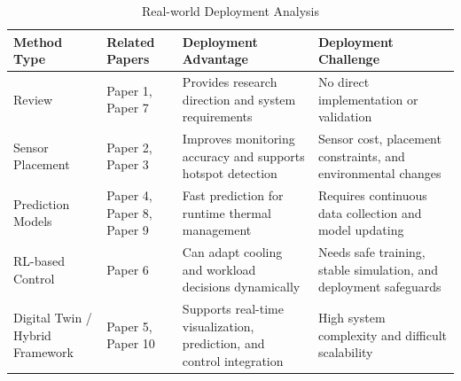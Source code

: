 \documentclass[12pt,a4paper]{article}
\begin{document}
                    \begin{table}[h]
                    \centering
                    \caption{Real-world Deployment Analysis}
                    \label{tab:deployment_analysis}
                    \begin{tabular}{p{3cm} p{4cm} p{4cm} p{4cm}}
                    \toprule
                    Method Type & Related Papers & Deployment Advantage & Deployment Challenge \\
                    \midrule
                    Review & Paper 1, Paper 7 & Provides research direction and system requirements & No direct implementation or validation \\
                    
                    Sensor Placement & Paper 2, Paper 3 & Improves monitoring accuracy and supports hotspot detection & Sensor cost, placement constraints, and environmental changes \\
                    
                    Prediction Models & Paper 4, Paper 8, Paper 9 & Fast prediction for runtime thermal management & Requires continuous data collection and model updating \\
                    
                    RL-based Control & Paper 6 & Can adapt cooling and workload decisions dynamically & Needs safe training, stable simulation, and deployment safeguards \\
                    
                    Digital Twin / Hybrid Framework & Paper 5, Paper 10 & Supports real-time visualization, prediction, and control integration & High system complexity and difficult scalability \\
                    \bottomrule
                    \end{tabular}
                    \end{table}
                    
\end{document}
